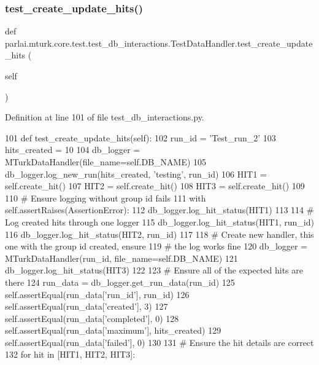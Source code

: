 \subsubsection{\texorpdfstring{test\+\_\+create\+\_\+update\+\_\+hits()}{test\_create\_update\_hits()}}
{\footnotesize\ttfamily def parlai.\+mturk.\+core.\+test.\+test\+\_\+db\+\_\+interactions.\+Test\+Data\+Handler.\+test\+\_\+create\+\_\+update\+\_\+hits (\begin{DoxyParamCaption}\item[{}]{self }\end{DoxyParamCaption})}



Definition at line 101 of file test\+\_\+db\+\_\+interactions.\+py.


\begin{DoxyCode}
101     \textcolor{keyword}{def }test\_create\_update\_hits(self):
102         run\_id = \textcolor{stringliteral}{'Test\_run\_2'}
103         hits\_created = 10
104         db\_logger = MTurkDataHandler(file\_name=self.DB\_NAME)
105         db\_logger.log\_new\_run(hits\_created, \textcolor{stringliteral}{'testing'}, run\_id)
106         HIT1 = self.create\_hit()
107         HIT2 = self.create\_hit()
108         HIT3 = self.create\_hit()
109 
110         \textcolor{comment}{# Ensure logging without group id fails}
111         with self.assertRaises(AssertionError):
112             db\_logger.log\_hit\_status(HIT1)
113 
114         \textcolor{comment}{# Log created hits through one logger}
115         db\_logger.log\_hit\_status(HIT1, run\_id)
116         db\_logger.log\_hit\_status(HIT2, run\_id)
117 
118         \textcolor{comment}{# Create new handler, this one with the group id created, ensure}
119         \textcolor{comment}{# the log works fine}
120         db\_logger = MTurkDataHandler(run\_id, file\_name=self.DB\_NAME)
121         db\_logger.log\_hit\_status(HIT3)
122 
123         \textcolor{comment}{# Ensure all of the expected hits are there}
124         run\_data = db\_logger.get\_run\_data(run\_id)
125         self.assertEqual(run\_data[\textcolor{stringliteral}{'run\_id'}], run\_id)
126         self.assertEqual(run\_data[\textcolor{stringliteral}{'created'}], 3)
127         self.assertEqual(run\_data[\textcolor{stringliteral}{'completed'}], 0)
128         self.assertEqual(run\_data[\textcolor{stringliteral}{'maximum'}], hits\_created)
129         self.assertEqual(run\_data[\textcolor{stringliteral}{'failed'}], 0)
130 
131         \textcolor{comment}{# Ensure the hit details are correct}
132         \textcolor{keywordflow}{for} hit \textcolor{keywordflow}{in} [HIT1, HIT2, HIT3]:

\end{DoxyCode}
